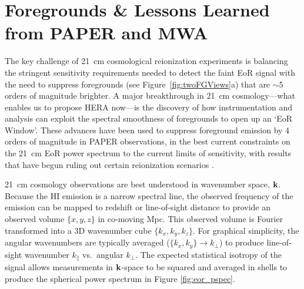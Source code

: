 \documentclass[preprint]{aastex}
\def\kperp{k_{\bot}}
\def\kpar{k_{\|}}
\def\k{{\bf k}}
\def\HI{{H{\small I }}}
\begin{document}

\vspace{-0.25in}
\section{Foregrounds \& Lessons Learned from PAPER and MWA}
\label{LessonsSec}

The key challenge of 21~cm cosmological reionization experiments is 
balancing the stringent sensitivity requirements needed to detect the faint EoR signal
with the need to suppress
foregrounds (see Figure~\ref{fig:twoFGViews}a) that are $\sim$5 orders of magnitude brighter.
A major breakthrough in 21~cm cosmology---what enables us to propose HERA now---is 
the discovery of how 
instrumentation and analysis can exploit the 
spectral smoothness of foregrounds
to open up an `EoR Window'.  
These advances have been used to suppress foreground emission by 4
orders of magnitude in PAPER observations,
in the best current constraints on the 21~cm EoR power spectrum
to the current limits of sensitivity,
with results that have begun ruling out certain reionization scenarios
\citep{parsons_et_al2013}.

21~cm cosmology observations are best understood in
wavenumber space, $\k$.  Because the \HI emission is a
narrow spectral line, the observed frequency of the emission can be mapped to
redshift or line-of-sight distance to provide an observed volume $\{x,y,z\}$ in
co-moving Mpc. This observed volume is Fourier transformed into a 3D
wavenumber cube $\{k_{x}, k_{y}, k_{z}\}$. For graphical simplicity, the angular
wavenumbers are typically averaged ($\{k_{x},k_{y}\}\rightarrow\kperp$) to
produce line-of-sight wavenumber $\kpar$ vs.\ angular $\kperp$. 
The expected statistical isotropy of the signal allows measurements in $\k$-space to be
squared and averaged in shells to produce the spherical power spectrum
in Figure \ref{fig:eor_pspec}.
\end{document}
